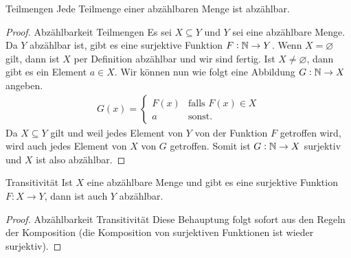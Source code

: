 \begin{lemma}{Teilmengen}
Jede Teilmenge einer abzählbaren Menge ist abzählbar.
\end{lemma}
\begin{proof}{Abzählbarkeit Teilmengen}
Es sei $X\subseteq Y$ und $Y$ sei eine abzählbare Menge. Da $Y$ abzählbar ist,
gibt es eine surjektive Funktion $F:\mathbb{N}\to Y$. Wenn $X=\varnothing$ gilt, dann
ist $X$ per Definition abzählbar und wir sind fertig. Ist $X\neq\varnothing$,
dann gibt es ein Element $a\in X$. Wir können nun wie folgt eine Abbildung
$G:\mathbb{N}\to X$ angeben.
\begin{align*}
G(x)=\begin{cases}
F(x)&\text{falls }F(x)\in X\\
a&\text{sonst.}
\end{cases}
\end{align*}
Da $X\subseteq Y$ gilt und weil jedes Element von $Y$ von der Funktion $F$
getroffen wird, wird auch jedes Element von $X$ von $G$ getroffen. Somit
ist $G:\mathbb{N}\to X$ surjektiv und $X$ ist also abzählbar.
\end{proof}

\begin{lemma}{Transitivität}
Ist $X$ eine abzählbare Menge und gibt es eine surjektive Funktion $F:X\to Y$, dann ist auch $Y$ abzählbar.
\end{lemma}
\begin{proof}{Abzählbarkeit Transitivität}
Diese Behauptung folgt sofort aus den Regeln der Komposition (die Komposition von surjektiven Funktionen ist wieder surjektiv).
\end{proof}



